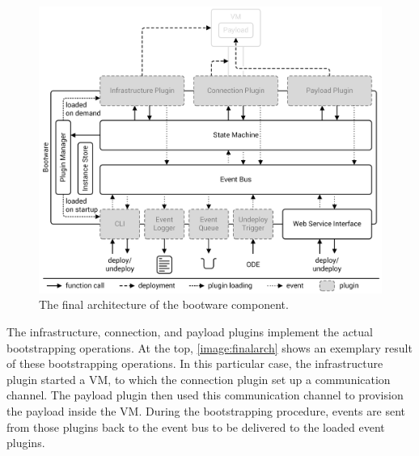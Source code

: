 \begin{figure}[!htbp]
	\centering
	\includegraphics[resolution=600]{design/assets/final_bootware_architecture}
	\caption{The final architecture of the bootware component.}
	\label{image:finalarch}
\end{figure}

The infrastructure, connection, and payload plugins implement the actual bootstrapping operations.
At the top, \autoref{image:finalarch} shows an exemplary result of these bootstrapping operations.
In this particular case, the infrastructure plugin started a VM, to which the connection plugin set up a communication channel.
The payload plugin then used this communication channel to provision the payload inside the VM.
During the bootstrapping procedure, events are sent from those plugins back to the event bus to be delivered to the loaded event plugins.
